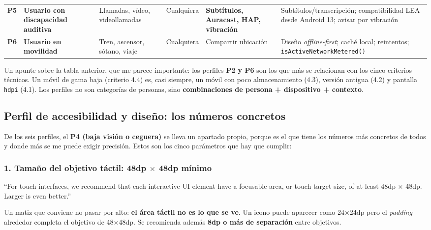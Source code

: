 \documentclass[11pt,a4paper]{article}
\newcommand{\code}[1]{\texttt{\color{primary}#1}}
\begin{document}
{\begin{xltabular}{\textwidth}{@{}c >{\RaggedRight\arraybackslash}p{2.4cm} >{\RaggedRight\arraybackslash}p{2.5cm} >{\RaggedRight\arraybackslash}p{2.7cm} >{\RaggedRight\arraybackslash}p{2.7cm} >{\RaggedRight\arraybackslash}X@{}}
			\textbf{P5} & \textbf{Usuario con discapacidad auditiva} & Llamadas, vídeo, videollamadas & Cualquiera & \textbf{Subtítulos, Auracast, HAP, vibración} & Subtítulos/transcripción; compatibilidad LEA desde Android 13; avisar por vibración \\
			\textbf{P6} & \textbf{Usuario en movilidad} & Tren, ascensor, sótano, viaje & Cualquiera & Compartir ubicación & Diseño \emph{offline-first}; caché local; reintentos; \code{isActiveNetworkMetered()} \\
		\end{xltabular}
	}
	
	Un apunte sobre la tabla anterior, que me parece importante: los perfiles \textbf{P2 y P6} son los que más se relacionan con los cinco criterios técnicos. Un móvil de gama baja (criterio 4.4) es, casi siempre, un móvil con poco almacenamiento (4.3), versión antigua (4.2) y pantalla \code{hdpi} (4.1). Los perfiles no son categorías de personas, sino \textbf{combinaciones de persona + dispositivo + contexto}.
	
	\subsection{Perfil de accesibilidad y diseño: los números concretos}
	
	De los seis perfiles, el \textbf{P4 (baja visión o ceguera)} se lleva un apartado propio, porque es el que tiene los números más concretos de todos y donde más se me puede exigir precisión. Estos son los cinco parámetros que hay que cumplir:
	
	\subsubsection*{1. Tamaño del objetivo táctil: 48dp $\times$ 48dp mínimo}
	
	\enquote{For touch interfaces, we recommend that each interactive UI element have a focusable area, or touch target size, of at least 48dp $\times$ 48dp. Larger is even better.}
	
	Un matiz que conviene no pasar por alto: \textbf{el área táctil no es lo que se ve}. Un icono puede aparecer como 24$\times$24dp pero el \emph{padding} alrededor completa el objetivo de 48$\times$48dp. Se recomienda además \textbf{8dp o más de separación} entre objetivos.
	
\end{document}
